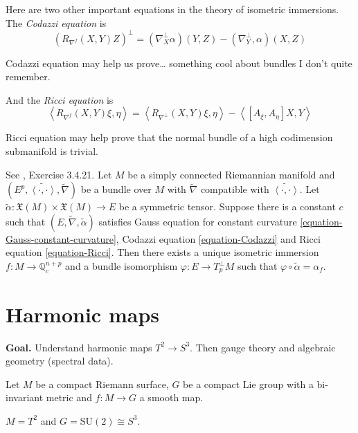 \medskip\noindent

Here are two other important equations in the theory of isometric immersions. 
The {\it Codazzi equation} is
\begin{equation}
\label{equation-Codazzi}
(R_{\nabla^f}(X,Y)Z)^\perp
=(\nabla^\perp_X\alpha)(Y,Z)-(\nabla^\perp_Y,\alpha)(X,Z)
\end{equation}

Codazzi equation may help us prove… something cool about bundles I don't quite
remember.

And the {\it Ricci equation} is
\begin{equation}
\label{equation-Ricci}
\left<R_{\nabla^f}(X,Y)\xi,\eta\right>
=\left<R_{\nabla^\perp}(X,Y)\xi,\eta\right>
-\left<[A_\xi,A_\eta]X,Y\right>
\end{equation}

Ricci equation may help prove that the normal bundle of a high codimension
submanifold is trivial.

\begin{theorem}
\label{theorem-fundamental-theorem-of-submanifolds}
See \cite{pet}, Exercise 3.4.21. Let $M$ be a simply connected Riemannian 
manifold and $(E^p,\widetilde{\left<\cdot,\cdot\right>},\tilde{\nabla})$ be a 
bundle over $M$ with $\tilde{\nabla}$ compatible with 
$\widetilde{\left<\cdot,\cdot\right>}$.
Let $\tilde{\alpha}:\mathfrak{X}(M)\times \mathfrak{X}(M)\to E$ be a symmetric
tensor. Suppose there is a constant $c$ such that
$(E,\tilde{\nabla},\tilde{\alpha})$ satisfies Gauss equation for constant
curvature \ref{equation-Gauss-constant-curvature}, Codazzi equation
\ref{equation-Codazzi} and Ricci equation \ref{equation-Ricci}. 
Then there exists a unique isometric
immersion $f:M \to \mathbb{Q}_c^{n+p}$ and a bundle isomorphism $\varphi:E \to
T^\perp_pM$ such that $\varphi\circ\tilde{\alpha}=\alpha_f$.
\end{theorem}

\section{Harmonic maps}
\label{section-harmonic-maps}

{\bf Goal.} Understand harmonic maps $T^2 \to S^3$. Then gauge theory and
algebraic geometry (spectral data).

Let $M$ be a compact Riemann surface, $G$ be a compact Lie group with a
bi-invariant metric and $f:M\to G$ a smooth map.

\begin{example}
\label{example-torus}
$M=T^2$ and $G=\text{SU}(2)\cong S^3$.
\end{example}

